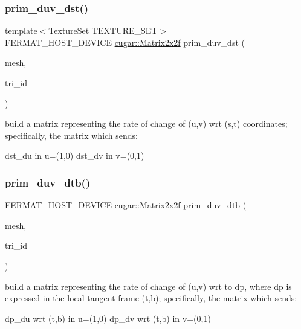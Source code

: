 \subsubsection{\texorpdfstring{prim\+\_\+duv\+\_\+dst()}{prim\_duv\_dst()}}
{\footnotesize\ttfamily template$<$Texture\+Set T\+E\+X\+T\+U\+R\+E\+\_\+\+S\+ET$>$ \\
F\+E\+R\+M\+A\+T\+\_\+\+H\+O\+S\+T\+\_\+\+D\+E\+V\+I\+CE \hyperlink{structcugar_1_1_matrix}{cugar\+::\+Matrix2x2f} prim\+\_\+duv\+\_\+dst (\begin{DoxyParamCaption}\item[{const \hyperlink{struct_mesh_view}{Mesh\+View} \&}]{mesh,  }\item[{const uint32}]{tri\+\_\+id }\end{DoxyParamCaption})\hspace{0.3cm}{\ttfamily [inline]}}

build a matrix representing the rate of change of (u,v) wrt (s,t) coordinates; specifically, the matrix which sends\+:

dst\+\_\+du in u=(1,0) dst\+\_\+dv in v=(0,1) \mbox{\label{group___mesh_module_gaa2d04b7a4f0a9b63a1783feae4dae840}} 
\subsubsection{\texorpdfstring{prim\+\_\+duv\+\_\+dtb()}{prim\_duv\_dtb()}}
{\footnotesize\ttfamily F\+E\+R\+M\+A\+T\+\_\+\+H\+O\+S\+T\+\_\+\+D\+E\+V\+I\+CE \hyperlink{structcugar_1_1_matrix}{cugar\+::\+Matrix2x2f} prim\+\_\+duv\+\_\+dtb (\begin{DoxyParamCaption}\item[{const \hyperlink{struct_mesh_view}{Mesh\+View} \&}]{mesh,  }\item[{const uint32}]{tri\+\_\+id }\end{DoxyParamCaption})\hspace{0.3cm}{\ttfamily [inline]}}

build a matrix representing the rate of change of (u,v) wrt to dp, where dp is expressed in the local tangent frame (t,b); specifically, the matrix which sends\+:

dp\+\_\+du wrt (t,b) in u=(1,0) dp\+\_\+dv wrt (t,b) in v=(0,1) \mbox{\label{group___mesh_module_gabeca667804111edec7ffce34196f3668}} 
